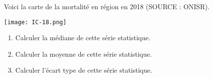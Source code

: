 
Voici la carte de la mortalité en région en 2018 (SOURCE : ONISR).

\begin{center}
\texttt{[image: IC-18.png]}
\end{center}


\begin{enumerate}
\item Calculer la médiane de cette série statistique.
\item Calculer la moyenne de cette série statistique.
\item Calculer l'écart type de cette série statistique.
\end{enumerate} 